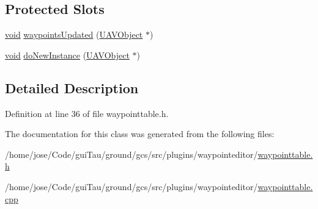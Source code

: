\subsection*{Protected Slots}
\begin{DoxyCompactItemize}
\item 
\hyperlink{group___u_a_v_objects_plugin_ga444cf2ff3f0ecbe028adce838d373f5c}{void} \hyperlink{group___waypoint_editor_gadget_plugin_ga8bb82818bb89a4aa0b56bdda689058cd}{waypoints\-Updated} (\hyperlink{class_u_a_v_object}{U\-A\-V\-Object} $\ast$)
\item 
\hyperlink{group___u_a_v_objects_plugin_ga444cf2ff3f0ecbe028adce838d373f5c}{void} \hyperlink{group___waypoint_editor_gadget_plugin_gadfa77191d509fa658e36cdff9553dd25}{do\-New\-Instance} (\hyperlink{class_u_a_v_object}{U\-A\-V\-Object} $\ast$)
\end{DoxyCompactItemize}


\subsection{Detailed Description}


Definition at line 36 of file waypointtable.\-h.



The documentation for this class was generated from the following files\-:\begin{DoxyCompactItemize}
\item 
/home/jose/\-Code/gui\-Tau/ground/gcs/src/plugins/waypointeditor/\hyperlink{waypointtable_8h}{waypointtable.\-h}\item 
/home/jose/\-Code/gui\-Tau/ground/gcs/src/plugins/waypointeditor/\hyperlink{waypointtable_8cpp}{waypointtable.\-cpp}\end{DoxyCompactItemize}
